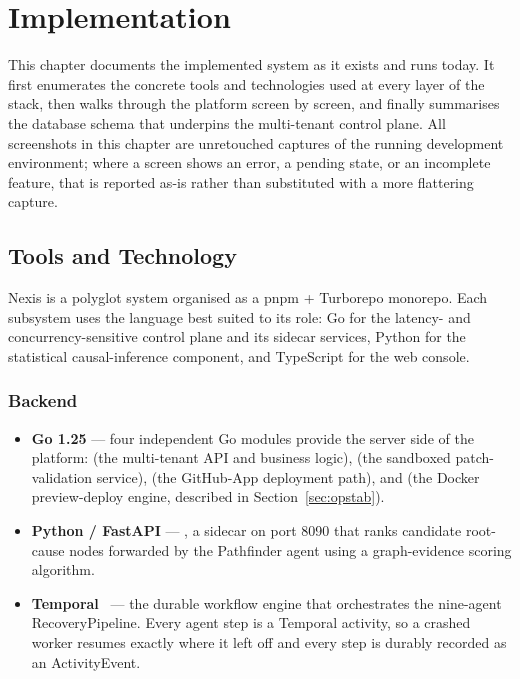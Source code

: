 \chapter{Implementation}
\label{ch:implementation}

This chapter documents the implemented system as it exists and runs today. It
first enumerates the concrete tools and technologies used at every layer of
the stack, then walks through the platform screen by screen, and finally
summarises the database schema that underpins the multi-tenant control plane.
All screenshots in this chapter are unretouched captures of the running
development environment; where a screen shows an error, a pending state, or an
incomplete feature, that is reported as-is rather than substituted with a more
flattering capture.

\section{Tools and Technology}
\label{sec:tools}

Nexis is a polyglot system organised as a pnpm + Turborepo monorepo. Each
subsystem uses the language best suited to its role: Go for the latency- and
concurrency-sensitive control plane and its sidecar services, Python for the
statistical causal-inference component, and TypeScript for the web console.

\subsection{Backend}

\begin{itemize}[itemsep=2pt]
  \item \textbf{Go 1.25} --- four independent Go modules provide the server
        side of the platform:  (the multi-tenant
        API and business logic),  (the sandboxed
        patch-validation service),  (the GitHub-App
        deployment path), and  (the Docker
        preview-deploy engine, described in Section~\ref{sec:opstab}).
  \item \textbf{Python / FastAPI} --- , a
        sidecar on port 8090 that ranks candidate root-cause nodes forwarded
        by the Pathfinder agent using a graph-evidence scoring algorithm.
  \item \textbf{Temporal}~\cite{temporal} --- the durable workflow engine
        that orchestrates the nine-agent RecoveryPipeline. Every agent step
        is a Temporal activity, so a crashed worker resumes exactly where it
        left off and every step is durably recorded as an ActivityEvent.
\end{itemize}

